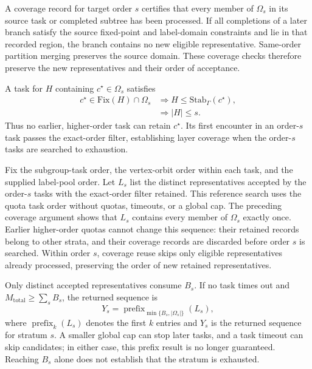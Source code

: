 \documentclass[a5paper, 10pt]{article}
\begin{document}
A coverage record for target order $s$ certifies that every member of $\Omega_s$ in its source task or completed subtree has been processed. If all completions of a later branch satisfy the source fixed-point and label-domain constraints and lie in that recorded region, the branch contains no new eligible representative. Same-order partition merging preserves the source domain. These coverage checks therefore preserve the new representatives and their order of acceptance.

A task for $H$ containing $c^\star\in\Omega_s$ satisfies
\begin{equation}
\begin{aligned}
c^\star\in\mathrm{Fix}(H)\cap\Omega_s
&\Longrightarrow H\leq\mathrm{Stab}_{\Gamma}(c^\star),\\
&\Longrightarrow |H|\leq s.
\end{aligned}
\label{eq:quota_layer_order}
\end{equation}
Thus no earlier, higher-order task can retain $c^\star$. Its first encounter in an order-$s$ task passes the exact-order filter, establishing layer coverage when the order-$s$ tasks are searched to exhaustion.

Fix the subgroup-task order, the vertex-orbit order within each task, and the supplied label-pool order. Let $L_s$ list the distinct representatives accepted by the order-$s$ tasks with the exact-order filter retained. This reference search uses the quota task order without quotas, timeouts, or a global cap. The preceding coverage argument shows that $L_s$ contains every member of $\Omega_s$ exactly once. Earlier higher-order quotas cannot change this sequence: their retained records belong to other strata, and their coverage records are discarded before order $s$ is searched. Within order $s$, coverage reuse skips only eligible representatives already processed, preserving the order of new retained representatives.

Only distinct accepted representatives consume $B_s$. If no task times out and $M_{\mathrm{total}}\geq\sum_s B_s$, the returned sequence is
\begin{equation}
Y_s=\operatorname{prefix}_{\min\{B_s,|\Omega_s|\}}(L_s),
\label{eq:quota_prefix}
\end{equation}
where $\operatorname{prefix}_k(L_s)$ denotes the first $k$ entries and $Y_s$ is the returned sequence for stratum $s$. A smaller global cap can stop later tasks, and a task timeout can skip candidates; in either case, this prefix result is no longer guaranteed. Reaching $B_s$ alone does not establish that the stratum is exhausted.
\end{document}
